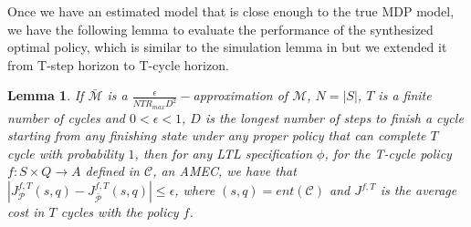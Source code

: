 \documentclass[journal]{IEEEtran}
\newtheorem{lemma}{Lemma}
\begin{document}
Once we have an estimated model that is close enough to the true MDP model, we have the following lemma to evaluate the performance of the synthesized optimal policy, which is similar to the simulation lemma in \cite{brafman2002r} but we extended it from T-step horizon to T-cycle horizon.
\begin{lemma}\label{lemma:main}
	If $\bar{\mathcal{M}}$ is a $\frac{\epsilon}{NTR_{max}D^2}-$approximation of $\mathcal{M}$, $N=|S|$, $T$ is a finite number of cycles and $0<\epsilon<1$, $D$ is the longest number of steps to finish a cycle starting from any finishing state under any proper policy that can complete $T$ cycle with probability $1$, then for any LTL specification $\phi$, for the T-cycle policy $f :S\times Q\rightarrow A
	$
	defined in $\mathcal{C}$, an AMEC, we have that $|J^{f,T}_{\mathcal{P}}(s,q)-J^{f,T}_{\bar{\mathcal{P}}}(s,q)|\leq\epsilon$, where $(s,q)=ent(\mathcal{C})$ and $J^{f,T}$ is the average cost in $T$ cycles with the policy $f$.  
\end{lemma} 
\end{document}
